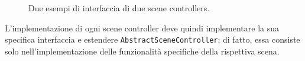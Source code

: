 \documentclass[a4paper,12pt]{report}
\begin{document}
\begin{figure}[H]
\centering
{}
\caption{Due esempi di interfaccia di due scene controllers.}
\label{images:scene-controllers-interfaces}
\end{figure}

L'implementazione di ogni scene controller deve quindi implementare la sua specifica interfaccia e estendere \texttt{AbstractSceneController}; di fatto, essa consiste solo nell'implementazione delle funzionalità specifiche della rispettiva scena.
\end{document}
